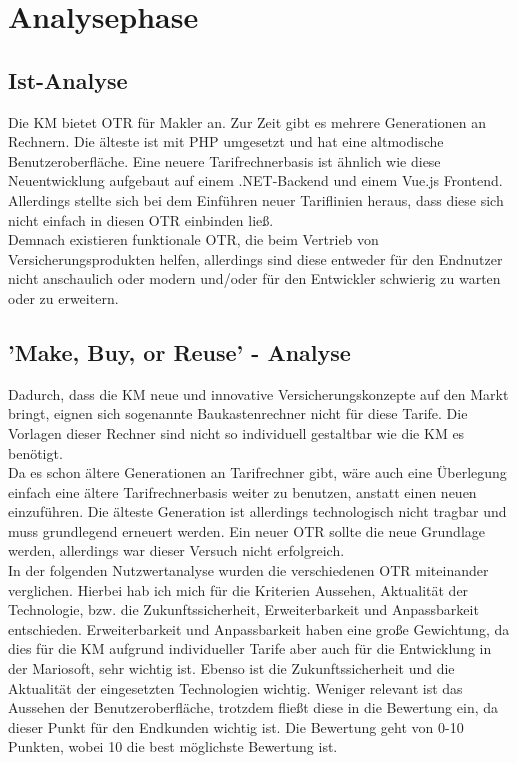 \newpage
\section{Analysephase}
\label{analysephase}

\subsection{Ist-Analyse}
\label{ist}
\begin{comment}
evtl alte otrs mit nutzwertanalyse vergleichen?
\end{comment}
Die \ac{KM} bietet \ac{OTR} für Makler an. Zur Zeit gibt es mehrere Generationen an Rechnern. Die älteste ist mit PHP umgesetzt und hat eine altmodische Benutzeroberfläche. Eine neuere Tarifrechnerbasis ist ähnlich wie diese Neuentwicklung aufgebaut auf einem .NET-Backend und einem Vue.js Frontend. Allerdings stellte sich bei dem Einführen neuer Tariflinien heraus, dass diese sich nicht einfach in diesen \ac{OTR} einbinden ließ. \\
Demnach existieren funktionale \ac{OTR}, die beim Vertrieb von Versicherungsprodukten helfen, allerdings sind diese entweder für den Endnutzer nicht anschaulich oder modern und/oder für den Entwickler schwierig zu warten oder zu erweitern.

\subsection{'Make, Buy, or Reuse' - Analyse}
\label{makeOrBuy}

Dadurch, dass die \ac{KM} neue und innovative Versicherungskonzepte auf den Markt bringt, eignen sich sogenannte Baukastenrechner nicht für diese Tarife. Die Vorlagen dieser Rechner sind nicht so individuell gestaltbar wie die \ac{KM} es benötigt.\\
Da es schon ältere Generationen an Tarifrechner gibt, wäre auch eine Überlegung einfach eine ältere Tarifrechnerbasis weiter zu benutzen, anstatt einen neuen einzuführen. Die älteste Generation ist allerdings technologisch nicht tragbar und muss grundlegend erneuert werden. Ein neuer \ac{OTR} sollte die neue Grundlage werden, allerdings war dieser Versuch nicht erfolgreich.\\
In der folgenden Nutzwertanalyse wurden die verschiedenen \ac{OTR} miteinander verglichen. Hierbei hab ich mich für die Kriterien Aussehen, Aktualität der Technologie, bzw. die Zukunftssicherheit, Erweiterbarkeit und Anpassbarkeit entschieden. Erweiterbarkeit und Anpassbarkeit haben eine große Gewichtung, da dies für die \ac{KM} aufgrund individueller Tarife aber auch für die Entwicklung in der Mariosoft, sehr wichtig ist. Ebenso ist die Zukunftssicherheit und die Aktualität der eingesetzten Technologien wichtig. Weniger relevant ist das Aussehen der Benutzeroberfläche, trotzdem fließt diese in die Bewertung ein, da dieser Punkt für den Endkunden wichtig ist. Die Bewertung geht von 0-10 Punkten, wobei 10 die best möglichste Bewertung ist.\\
\\

